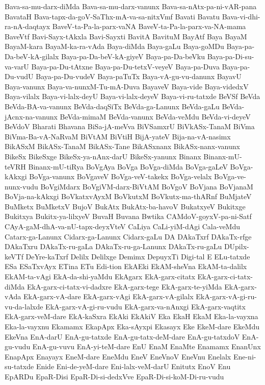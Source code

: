 {Bava-sa-mu-darx-diMda
Bava-sa-mu-darx-vanunx
Bava-sa-nAtx-pa-ni-vAR-pana
BavataH
Bava-tapx-da-goV-SaThx-mA-va-sa-nitxVmf
Bavati
Bavatu
Bava-vi-dhi-ra-nA-daqtayx
BaveV-ta-Pa-la-parx-vaNA
BaveV-ta-Pa-la-parx-va-NA-mama
BaveVtf
Bavi-Sayx-tAkxla
Bavi-Sayxti
BavitA
BavituM
BayAtf
Baya
BayaM
BayaM-kara
BayaM-ka-ra-vAda
Baya-diMda
Baya-gaLu
Baya-goMDu
Baya-pa-Da-beV-kA-gilalx
Baya-pa-Da-beV-kA-giyeV
Baya-pa-Da-beVku
Baya-pa-Di-su-va-varU
Baya-pa-Du-tAtxne
Baya-pa-Du-tetxV-veyeV
Baya-pa-Duva
Baya-pa-Du-vudU
Baya-pa-Du-vudeV
Baya-paTuTx
Baya-vA-gu-vu-danunx
BayavU
Baya-vanunx
Baya-va-nunxM-Tu-mA-Duva
BayaveV
Baya-vide
Baya-videdxV
Baya-vilalx
Baya-vi-lalx-deyU
Baya-vi-lalx-deyeV
Baya-vi-ru-tatxde
BeVSf
BeVda
BeVda-BA-va-vanunx
BeVda-daqSiTx
BeVda-ga-Lanunx
BeVda-gaLu
BeVda-jAcnx-na-vanunx
BeVda-mimaM
BeVda-vanunx
BeVda-veMdu
BeVda-vi-deyeV
BeVdoV
Bharati
Bhavana
BiSa-jA-meVva
BiVSamxrU
BiVkASx-TanaM
BiVma
BiVma-Ba-vA-NaRvaM
BiVtAM
BiVtiH
BijA-yateV
Bija-na-vA-nasimx
BikASxM
BikASx-TanaM
BikASx-Tane
BikASxnanx
BikASx-nanx-vanunx
BikeSx
BikeSxge
BikeSx-ya-nAnx-darU
BikeSx-yanunx
Binanx
Binanx-mU-teVRH
Binanx-mU-tiRya
BoVgAya
BoVga
BoVga-diMda
BoVga-gaLeV
BoVga-kAkxgi
BoVga-vanunx
BoVgaveV
BoVga-veV-takekx
BoVga-velalx
BoVga-ve-nunx-vudu
BoVgiMdarx
BoVgiVM-darx-BiVtAM
BoVgoV
BoVjana
BoVjanaM
BoVja-na-kAkxgi
BoVkatxvAyxM
BoVkutxM
BoVkutx-ma-thARnf
BuMjateV
BuMketx
BuMketxV
BujoV
BukAtx
BukAtx-ba-havoV
BukatxyeV
Bukitxge
Bukitxya
Bukitx-ya-lilxyeV
BuvaH
Buvana
Bwtika
CAMdoV-goyxV-pa-ni-Satf
CAyA-gaM-dhA-va-nU-tapx-deyxVteV
CaLiya
CaLi-yiM-dAgi
Cala-veMdu
Catarx-ga-Lanunx
Cidarx-ga-Lanunx
Cidarx-gaLu
DA
DAkaTxrf
DAkaTx-rfge
DAkaTxru
DAkaTx-ru-gaLa
DAkaTx-ru-ga-Lanunx
DAkaTx-ru-gaLu
DUpilx-keVTf
DeYre-kaTxrf
Delilx
Delilxge
Demimx
DepuyxTi
Digi-tal
E
ELu-tatxde
ESa
ESaTxvAyx
ETina
ETu
Edi-tion
EkAEki
EkAM-sheVna
EkAM-ta-dalilx
EkAM-ta-vAgi
EkA-da-shi-yaMdu
EkAgarx
EkA-garx-citatx
EkA-garx-ci-tatx-diMda
EkA-garx-ci-tatx-vi-dadxre
EkA-garx-tege
EkA-garx-te-yiMda
EkA-garx-vAda
EkA-garx-vA-dare
EkA-garx-vAgi
EkA-garx-vA-gilalx
EkA-garx-vA-gi-ru-vu-da-lalxde
EkA-garx-vA-gi-ru-vudu
EkA-garx-va-nAnxgi
EkA-garx-vaqtitx
EkA-garx-veM-dare
EkA-kaSxra
EkAki
EkAkiV
Eka
EkaH
EkaM
Eka-la-vayxna
Eka-la-vayxnu
Ekamamx
EkapApx
Eka-sAyxpi
Ekasayx
Eke
EkeM-dare
EkeMdu
EkeVna
EnA-darU
EnA-gu-tatxde
EnA-gu-tatx-deM-dare
EnA-gu-tatxdoV
EnA-gu-vudu
EnA-gu-vuvu
EnA-yi-teM-dare
EnU
EnaM
EnaMte
Enamamx
EnanUnx
EnapApx
Enayayx
EneM-dare
EneMdu
EneV
EneVnoV
EneVnu
Enelalx
Ene-ni-su-tatxde
Enide
Eni-de-yeM-dare
Eni-lalx-veM-darU
Enitutx
EnoV
Enu
EpARDu
EpaR-Disi
EpaR-Di-si-dedxVve
EpaR-Di-si-koM-Di-ru-vudu
}
